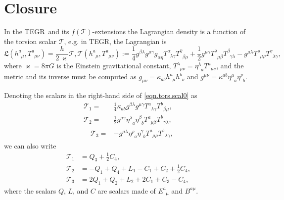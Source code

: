 \documentclass[
10pt, %
a4paper, %
oneside, %
headinclude,footinclude, %
BCOR5mm, %
]{scrartcl}
\newcommand{\mg}[1]{\kappa_{#1}}			%
\newcommand{\MG}[1]{\kappa^{#1}}			%
\newcommand{\tetrsymbol}{h}
\newcommand{\itetrsymbol}{\eta}
\newcommand{\itetr}[2]{\itetrsymbol^{#1}_{\phantom{#1}#2}}
\newcommand{\tetr}[2]{\tetrsymbol^{#1}_{\phantom{#1}#2}}
\newcommand{\detTetr}{\tetrsymbol}
\newcommand{\Tors}[2]{T^{#1}_{\phantom{a}#2}}
\newcommand{\ET}[2]{E^{#1}_{\phantom{#1}#2}}	%
\newcommand{\BT}[2]{B^{#1#2}}	%
\newcommand{\Lagtors}{\mathfrak{L}}%
\newcommand{\tegr}{TEGR}
\newcommand{\Tscal}{\mathcal{T}}		%
\begin{document}
\section{Closure}



In the \tegr\ and its $ f(\Tscal) $-extensions the Lagrangian density is a function of the 
torsion scalar $ \Tscal $, e.g. in \tegr, the Lagrangian is
\begin{subequations}\label{eq.TEGR.Lagr}
	\begin{equation}
		\Lagtors(\tetr{a}{\mu},\Tors{a}{\mu\nu}) = \frac{\detTetr}{2 \, \varkappa} \Tscal,
	\end{equation}
	\begin{equation}\label{eqn.tors.scal0}
		\Tscal(\tetr{a}{\mu},\Tors{a}{\mu\nu}) := 
		\frac14 g^{\beta\lambda} g^{\mu\gamma} g_{\alpha\eta} \Tors{\alpha}{\lambda\gamma}
		\Tors{\eta}{\beta\mu} +
		\frac12 g^{\mu\gamma} \Tors{\lambda}{\mu\beta} \Tors{\beta}{\gamma\lambda} - 
		g^{\mu\lambda} \Tors{\rho}{\mu\rho} \Tors{\gamma}{\lambda\gamma},	  
	\end{equation}
\end{subequations}
where $ \varkappa = 8\pi G $ is the Einstein gravitational constant, $ \Tors{\lambda}{\mu\nu} = 
\itetr{\lambda}{a} \Tors{a}{\mu\nu} $, and the metric and its 
inverse must be computed as $ g_{\mu\nu} = 
\mg{ab}\tetr{a}{\mu}\tetr{b}{\nu} $ and $ g^{\mu\nu} = \MG{ab}\itetr{\mu}{a}\itetr{\nu}{b}$.

Denoting the scalars in the right-hand side of \eqref{eqn.tors.scal0} as
\begin{align}\label{eqn.tors.scal}
	\Tscal_1 = & \frac14 \mg{ab}g^{\beta\lambda }g^{\mu\gamma 
	}\Tors{a}{\lambda\gamma} \Tors{b}{\beta\mu },\\[2mm]
	\Tscal_2 = & \frac12 g^{\mu\gamma} \itetr{\lambda}{a} \itetr{\beta}{b} \Tors{a}{\mu\beta} 
	\Tors{b}{\gamma\lambda},\\[2mm]
	\quad
	\Tscal_3 = & -g^{\mu\lambda} \itetr{\rho}{a} \itetr{\gamma}{b} \Tors{a}{\mu\rho} 
	 \Tors{b}{\lambda\gamma},	  
\end{align}
we can also write 
\begin{align}\label{eqn.tors.scal.TQLC}
	\mathcal{T}_1 &= Q_3 + \frac12 C_4, \\
	\mathcal{T}_2 &=- Q_1 + Q_4 + L_1 -C_1 + C_2 + \frac12 C_4, \\[2mm]
	\mathcal{T}_3 &= 2 Q_1 + Q_2 + L_2 + 2 C_1 + C_3 - C_4,
\end{align}
where the scalars $ Q $, $ L $, and $ C $ are scalars made of $ \ET{a}{\mu} $ and 
$ \BT{a}{\mu} $.
\end{document}
